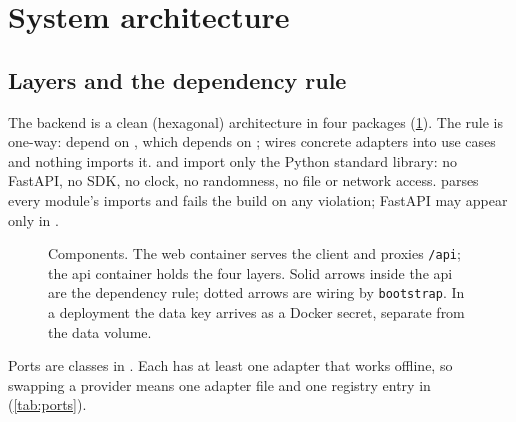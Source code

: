 \section{System architecture}\label{sec:architecture}

\subsection{Layers and the dependency rule}\label{sec:layers}

The backend is a clean (hexagonal) architecture in four packages (\cref{fig:architecture}). The rule is one-way:
 depend on , which depends on ;  wires concrete adapters
into use cases and nothing imports it.  and  import only the Python standard library:
no FastAPI, no SDK, no clock, no randomness, no file or network access. 
parses every module's imports and fails the build on any violation; FastAPI may appear only in
.

\begin{figure}[htbp]
  \centering
  
  \caption{Components. The web container serves the client and proxies \texttt{/api}; the api container holds the four
  layers. Solid arrows inside the api are the dependency rule; dotted arrows are wiring by \texttt{bootstrap}. In a
  deployment the data key arrives as a Docker secret, separate from the data volume.}\label{fig:architecture}
\end{figure}

Ports are  classes in . Each has at least one adapter that works
offline, so swapping a provider means one adapter file and one registry entry in 
(\cref{tab:ports}).

